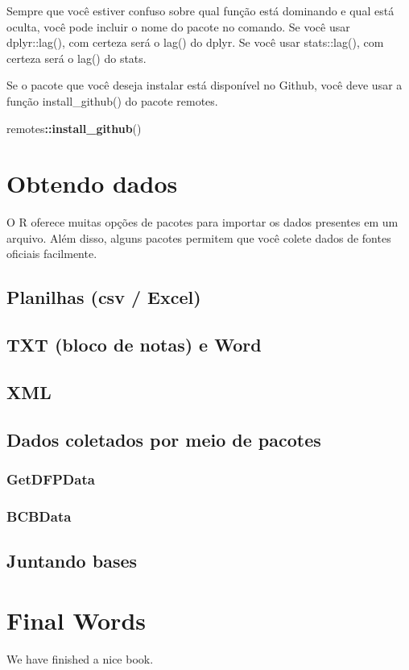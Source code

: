 \documentclass[
]{book}
\newenvironment{Shaded}{\begin{snugshade}}{\end{snugshade}}
\newcommand{\KeywordTok}[1]{\textcolor[rgb]{0.13,0.29,0.53}{\textbf{#1}}}
\newcommand{\NormalTok}[1]{#1}
\newcommand{\OperatorTok}[1]{\textcolor[rgb]{0.81,0.36,0.00}{\textbf{#1}}}
\begin{document}
Sempre que você estiver confuso sobre qual função está dominando e qual está oculta, você pode incluir o nome do pacote no comando. Se você usar dplyr::lag(), com certeza será o lag() do dplyr. Se você usar stats::lag(), com certeza será o lag() do stats.

Se o pacote que você deseja instalar está disponível no Github, você deve usar a função install\_github() do pacote remotes.

\begin{Shaded}
\begin{Highlighting}[]
\NormalTok{remotes}\OperatorTok{::}\KeywordTok{install_github}\NormalTok{()}
\end{Highlighting}
\end{Shaded}

\hypertarget{obtendo-dados}{%
\chapter{Obtendo dados}\label{obtendo-dados}}

O R oferece muitas opções de pacotes para importar os dados presentes em um arquivo. Além disso, alguns pacotes permitem que você colete dados de fontes oficiais facilmente.

\hypertarget{planilhas-csv-excel}{%
\section{Planilhas (csv / Excel)}\label{planilhas-csv-excel}}

\hypertarget{txt-bloco-de-notas-e-word}{%
\section{TXT (bloco de notas) e Word}\label{txt-bloco-de-notas-e-word}}

\hypertarget{xml}{%
\section{XML}\label{xml}}

\hypertarget{dados-coletados-por-meio-de-pacotes}{%
\section{Dados coletados por meio de pacotes}\label{dados-coletados-por-meio-de-pacotes}}

\hypertarget{getdfpdata}{%
\subsection{GetDFPData}\label{getdfpdata}}

\hypertarget{bcbdata}{%
\subsection{BCBData}\label{bcbdata}}

\hypertarget{juntando-bases}{%
\section{Juntando bases}\label{juntando-bases}}

\hypertarget{final-words}{%
\chapter{Final Words}\label{final-words}}

We have finished a nice book.

  
\end{document}
